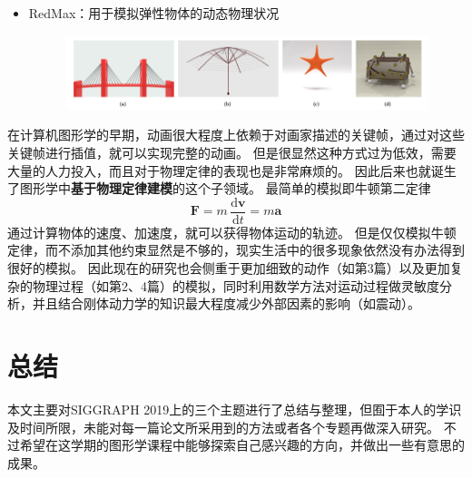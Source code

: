 \documentclass[logo,reportComp]{thesis}
\begin{document}
\begin{itemize}
\begin{figure}[H]
\end{figure}
	\item RedMax\cite{wang:redmax}：用于模拟弹性物体的动态物理状况
\begin{figure}[H]
\centering
\includegraphics[width=0.8\linewidth]{redmax.png}
\end{figure}
\end{itemize}

在计算机图形学的早期，动画很大程度上依赖于对画家描述的关键帧，通过对这些关键帧进行插值，就可以实现完整的动画。
但是很显然这种方式过为低效，需要大量的人力投入，而且对于物理定律的表现也是非常麻烦的。
因此后来也就诞生了图形学中\textbf{基于物理定律建模}的这个子领域。
最简单的模拟即牛顿第二定律
\[\mathbf {F} =m\,{\frac {\mathrm {d} \mathbf {v} }{\mathrm {d} t}}=m\mathbf {a}\]
通过计算物体的速度、加速度，就可以获得物体运动的轨迹。
但是仅仅模拟牛顿定律，而不添加其他约束显然是不够的，现实生活中的很多现象依然没有办法得到很好的模拟。
因此现在的研究也会侧重于更加细致的动作（如第3篇）以及更加复杂的物理过程（如第2、4篇）的模拟，同时利用数学方法对运动过程做灵敏度分析，并且结合刚体动力学的知识最大程度减少外部因素的影响（如震动）。


\section{总结}
本文主要对SIGGRAPH 2019上的三个主题进行了总结与整理，但囿于本人的学识及时间所限，未能对每一篇论文所采用到的方法或者各个专题再做深入研究。
不过希望在这学期的图形学课程中能够探索自己感兴趣的方向，并做出一些有意思的成果。
\end{document}
